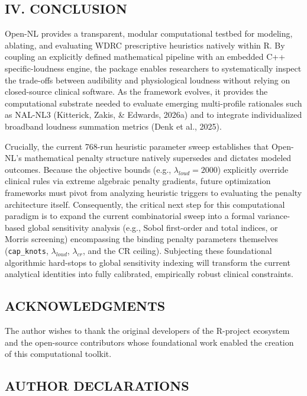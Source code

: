 \documentclass[
  12pt,
]{article}
\begin{document}
\subsection{IV. CONCLUSION}\label{iv.-conclusion}

Open-NL provides a transparent, modular computational testbed for
modeling, ablating, and evaluating WDRC prescriptive heuristics natively
within R. By coupling an explicitly defined mathematical pipeline with
an embedded C++ specific-loudness engine, the package enables
researchers to systematically inspect the trade-offs between audibility
and physiological loudness without relying on closed-source clinical
software. As the framework evolves, it provides the computational
substrate needed to evaluate emerging multi-profile rationales such as
NAL-NL3 (Kitterick, Zakis, \& Edwards, 2026a) and to integrate
individualized broadband loudness summation metrics (Denk et al., 2025).

Crucially, the current 768-run heuristic parameter sweep establishes
that Open-NL's mathematical penalty structure natively supersedes and
dictates modeled outcomes. Because the objective bounds (e.g.,
\(\lambda_{loud} = 2000\)) explicitly override clinical rules via
extreme algebraic penalty gradients, future optimization frameworks must
pivot from analyzing heuristic triggers to evaluating the penalty
architecture itself. Consequently, the critical next step for this
computational paradigm is to expand the current combinatorial sweep into
a formal variance-based global sensitivity analysis (e.g., Sobol
first-order and total indices, or Morris screening) encompassing the
binding penalty parameters themselves (\texttt{cap\_knots},
\(\lambda_{loud}\), \(\lambda_{cr}\), and the CR ceiling). Subjecting
these foundational algorithmic hard-stops to global sensitivity indexing
will transform the current analytical identities into fully calibrated,
empirically robust clinical constraints.

\subsection{ACKNOWLEDGMENTS}\label{acknowledgments}

The author wishes to thank the original developers of the R-project
ecosystem and the open-source contributors whose foundational work
enabled the creation of this computational toolkit.

\subsection{AUTHOR DECLARATIONS}\label{author-declarations}
\end{document}
